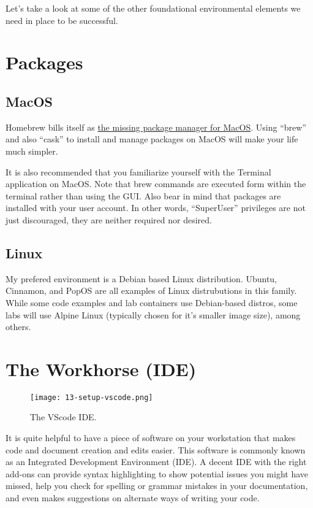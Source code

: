 Let's take a look at some of the other foundational environmental elements we need in place to be successful.

\section{Packages}

\subsection{MacOS}

Homebrew bills itself as \href{https://brew.sh/}{the missing package manager for MacOS}. Using ``brew'' and also
``cask'' to install and manage packages on MacOS will make your life much simpler.

\justifying
It is also recommended that you familiarize yourself with the Terminal application on MacOS. Note that brew
commands are executed form within the terminal rather than using the GUI. Also bear in mind that packages are
installed with your user account. In other words, ``SuperUser'' privileges are not just discouraged, they are
neither required nor desired.

\subsection{Linux}

My prefered environment is a Debian based Linux distribution. Ubuntu, Cinnamon, and PopOS are all examples of
Linux distrubutions in this family. While some code examples and lab containers use Debian-based distros, some labs will
use Alpine Linux (typically chosen for it's smaller image size), among others.

\section{The Workhorse (IDE)}

\begin{figure}[!htb]
\centering
\texttt{[image: 13-setup-vscode.png]}
\caption{The VScode IDE.}
\label{vscode-ide}
\end{figure}

\justifying
It is quite helpful to have a piece of software on your workstation that makes code and document creation and edits easier. This
software is commonly known as an Integrated Development Environment (IDE). A decent IDE with the right add-ons can
provide syntax highlighting to show potential issues you might have missed, help you check for spelling or
grammar mistakes in your documentation, and even makes suggestions on alternate ways of writing your code.


